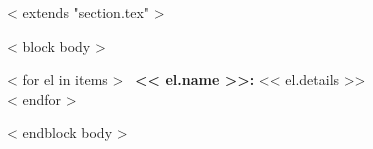 ~< extends "section.tex" >~

~< block body >~

~< for el in items >~
    \textbf{<< el.name >>:} << el.details >>\\
~< endfor >~

~< endblock body >~
